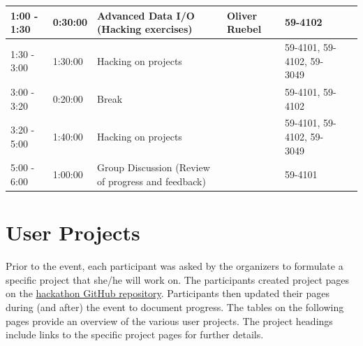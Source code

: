 \documentclass{article}
\begin{document}
\begin{table}[h!]
\begin{tabular}{|l|l|p{6cm}|p{2cm}|p{1.5cm}|l|}
1:00 - 1:30         & 0:30:00           & Advanced Data I/O (Hacking exercises)                                                        &  Oliver Ruebel           & 59-4102                                     & \cellcolor{yellow} \\ \hline                    
1:30 - 3:00         & 1:30:00           & Hacking on projects                                                                          &                          & 59-4101, 59-4102, 59-3049                   & \cellcolor{lime} \\ \hline                    
3:00 - 3:20         & 0:20:00           & Break                                                                                        &                          & 59-4101, 59-4102                            & \cellcolor{gray!25}  \\ \hline
3:20 - 5:00         & 1:40:00           & Hacking on projects                                                                          &                          & 59-4101, 59-4102, 59-3049                   & \cellcolor{lime} \\ \hline  
5:00 - 6:00         & 1:00:00           & Group Discussion (Review of progress and feedback)                                            &                         & 59-4101 & \cellcolor{gray!25}  \\ \hline

\end{tabular}
\end{table}


\clearpage
\section{User Projects}
\label{sec:userprojects}

Prior to the event, each participant was asked by the organizers to formulate a specific project that 
she/he will work on. The participants created project pages on the \href{https://github.com/NeurodataWithoutBorders/nwb_hackathons/tree/master/HCK05_2018_Berkeley/projects}{hackathon GitHub repository}. Participants then updated
their pages during (and after) the event to document progress. The tables on the following pages provide
an overview of the various user projects. The project headings include links to the specific project pages
for further details. 
\end{document}
